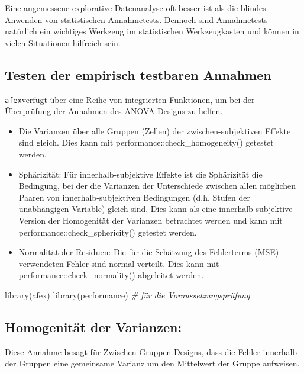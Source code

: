 \documentclass[
]{book}
\newenvironment{Shaded}{\begin{snugshade}}{\end{snugshade}}
\newcommand{\CommentTok}[1]{\textcolor[rgb]{0.56,0.35,0.01}{\textit{#1}}}
\newcommand{\FunctionTok}[1]{\textcolor[rgb]{0.00,0.00,0.00}{#1}}
\newcommand{\NormalTok}[1]{#1}
\providecommand{\tightlist}{%
  \setlength{\itemsep}{0pt}\setlength{\parskip}{0pt}}
\begin{document}
Eine angemessene explorative Datenanalyse oft besser ist als die blindes Anwenden von statistischen Annahmetests. Dennoch sind Annahmetests natürlich ein wichtiges Werkzeug im statistischen Werkzeugkasten und können in vielen Situationen hilfreich sein.

\hypertarget{testen-der-empirisch-testbaren-annahmen}{%
\subsection{Testen der empirisch testbaren Annahmen}\label{testen-der-empirisch-testbaren-annahmen}}

\texttt{afex}verfügt über eine Reihe von integrierten Funktionen, um bei der Überprüfung der Annahmen des ANOVA-Designs zu helfen.

\begin{itemize}
\tightlist
\item
  Die Varianzen über alle Gruppen (Zellen) der zwischen-subjektiven Effekte sind gleich. Dies kann mit performance::check\_homogeneity() getestet werden.
\item
  Sphärizität: Für innerhalb-subjektive Effekte ist die Sphärizität die Bedingung, bei der die Varianzen der Unterschiede zwischen allen möglichen Paaren von innerhalb-subjektiven Bedingungen (d.h. Stufen der unabhängigen Variable) gleich sind. Dies kann als eine innerhalb-subjektive Version der Homogenität der Varianzen betrachtet werden und kann mit performance::check\_sphericity() getestet werden.
\item
  Normalität der Residuen: Die für die Schätzung des Fehlerterms (MSE) verwendeten Fehler sind normal verteilt. Dies kann mit performance::check\_normality() abgeleitet werden.
\end{itemize}

\begin{Shaded}
\begin{Highlighting}[]
\FunctionTok{library}\NormalTok{(afex)}
\FunctionTok{library}\NormalTok{(performance) }\CommentTok{\# für die Voraussetzungsprüfung}
\end{Highlighting}
\end{Shaded}

\hypertarget{homogenituxe4t-der-varianzen}{%
\subsection{Homogenität der Varianzen:}\label{homogenituxe4t-der-varianzen}}

Diese Annahme besagt für Zwischen-Gruppen-Designs, dass die Fehler innerhalb der Gruppen eine gemeinsame Varianz um den Mittelwert der Gruppe aufweisen.
\end{document}
